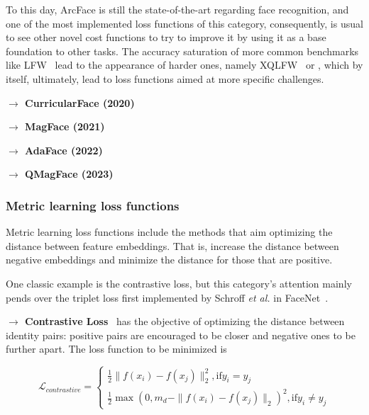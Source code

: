 \documentclass[class=report, crop=false, a4paper, 12pt]{standalone}
\begin{document}
\vspace{\baselineskip}
To this day, ArcFace is still the state-of-the-art regarding face recognition, and one of the most implemented loss functions of this category, consequently, is usual to see other novel cost functions to try to improve it by using it as a base foundation to other tasks. The accuracy saturation of more common benchmarks like LFW~\autocite{huangLabeledFacesWild} lead to the appearance of harder ones, namely XQLFW~\autocite{knocheCrossQualityLFWDatabase2021} or \autocite{kalkaIJBIARPAJanus2018}, which by itself, ultimately, lead to loss functions aimed at more specific challenges.

\vspace{0.7\baselineskip}
\noindent\textbf{$\rightarrow$ CurricularFace (2020)}

\vspace{0.7\baselineskip}
\noindent\textbf{$\rightarrow$ MagFace (2021)}

\vspace{0.7\baselineskip}
\noindent\textbf{$\rightarrow$ AdaFace (2022)}

\vspace{0.7\baselineskip}
\noindent\textbf{$\rightarrow$ QMagFace (2023)}

\subsubsection{Metric learning loss functions}
Metric learning loss functions include the methods that aim optimizing the distance between feature embeddings. That is, increase the distance between negative embeddings and minimize the distance for those that are positive.
\par One classic example is the contrastive loss, but this category's attention mainly pends over the triplet loss first implemented by Schroff \textit{et al.} in FaceNet~\autocite{schroffFaceNetUnifiedEmbedding2015}. 

\vspace{0.7\baselineskip}
\noindent\textbf{$\rightarrow$ Contrastive Loss}~\autocite{duElementsEndtoendDeep2022} has the objective of optimizing the distance between identity pairs: positive pairs are encouraged to be closer and negative ones to be further apart. The loss function to be minimized is

\begin{equation}
    \mathcal{L}_{contrastive} = 
    \begin{cases}
      \frac{1}{2}\|f(x_i)-f(x_j)\|^{2}_{2}, \text{if} y_i=y_j\\
      \frac{1}{2}\max{(0, m_d-\|f(x_i)-f(x_j)\|_2)^2}, \text{if} y_i\neq y_j
    \end{cases}
\end{equation}
\end{document}
